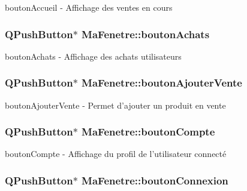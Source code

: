 bouton\-Accueil -\/ Affichage des ventes en cours 

\hypertarget{class_ma_fenetre_aba39f3cf91351a7d6d0a6188ac831ad5}{
\subsubsection[{bouton\-Achats}]{\setlength{\rightskip}{0pt plus 5cm}Q\-Push\-Button$\ast$ Ma\-Fenetre\-::bouton\-Achats\hspace{0.3cm}{\ttfamily [protected]}}}\label{class_ma_fenetre_aba39f3cf91351a7d6d0a6188ac831ad5}


bouton\-Achats -\/ Affichage des achats utilisateurs 

\hypertarget{class_ma_fenetre_a422d1e619aa51ff42b5ecd2c5476ce19}{
\subsubsection[{bouton\-Ajouter\-Vente}]{\setlength{\rightskip}{0pt plus 5cm}Q\-Push\-Button$\ast$ Ma\-Fenetre\-::bouton\-Ajouter\-Vente\hspace{0.3cm}{\ttfamily [protected]}}}\label{class_ma_fenetre_a422d1e619aa51ff42b5ecd2c5476ce19}


bouton\-Ajouter\-Vente -\/ Permet d'ajouter un produit en vente 

\hypertarget{class_ma_fenetre_abfdb548dc88cf56eae01fd20be7b052a}{
\subsubsection[{bouton\-Compte}]{\setlength{\rightskip}{0pt plus 5cm}Q\-Push\-Button$\ast$ Ma\-Fenetre\-::bouton\-Compte\hspace{0.3cm}{\ttfamily [protected]}}}\label{class_ma_fenetre_abfdb548dc88cf56eae01fd20be7b052a}


bouton\-Compte -\/ Affichage du profil de l'utilisateur connecté 

\hypertarget{class_ma_fenetre_a6654bb6885a843d1a6ad9399eb7d0c36}{
\subsubsection[{bouton\-Connexion}]{\setlength{\rightskip}{0pt plus 5cm}Q\-Push\-Button$\ast$ Ma\-Fenetre\-::bouton\-Connexion\hspace{0.3cm}{\ttfamily [protected]}}}\label{class_ma_fenetre_a6654bb6885a843d1a6ad9399eb7d0c36}


